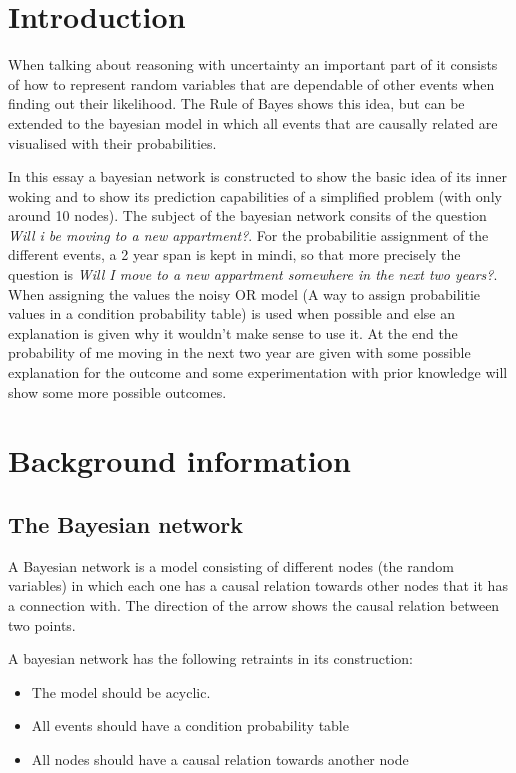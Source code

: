\documentclass[12pt]{article} %
\begin{document}
\section{Introduction} %

When talking about reasoning with uncertainty an important part of it consists
of how to represent random variables that are dependable of other events when finding out
their likelihood. The Rule of Bayes shows this idea, but can be extended to the
bayesian model in which all events that are causally related are visualised with
their probabilities.

In this essay a bayesian network is constructed to show the basic idea of its
inner woking and to
show its prediction capabilities of a simplified problem (with only around 10
nodes). The subject of the
bayesian network consits of the question \emph{Will i be moving to a new
appartment?}. For the probabilitie assignment of the different events, a 2 year span is
kept in mindi, so that more precisely the question is \emph{Will I move to a
new appartment somewhere in the next two years?}. When assigning the values the noisy OR model (A way to assign
probabilitie values in a condition probability table) is used when possible
and else an explanation is given why it wouldn't make sense to use it. 
At the end the probability of me moving in the next two year are given with some
possible explanation for the outcome and some
experimentation with prior knowledge will show some more possible outcomes.



\section{Background information}

\subsection{The Bayesian network} %

A Bayesian network is a model consisting of different nodes (the random
variables) in which each one
has a causal relation towards other nodes that it has a connection with. The
direction of the arrow shows the causal relation between two points.

A bayesian network has the following retraints in its construction:
\begin{itemize}
    \item The model should be acyclic. 
    \item All events should have a condition probability table 
    \item All nodes should have a causal relation towards another node
\end{itemize}
\end{document}
